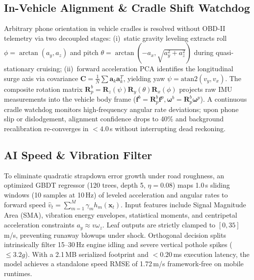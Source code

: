 \documentclass[conference]{IEEEtran}
\begin{document}
\subsection{In-Vehicle Alignment \& Cradle Shift Watchdog}
Arbitrary phone orientation in vehicle cradles is resolved without OBD-II telemetry via two decoupled stages: (i)~static gravity leveling extracts roll $\phi = \arctan(a_y, a_z)$ and pitch $\theta = \arctan(-a_x, \sqrt{a_y^2+a_z^2})$ during quasi-stationary cruising; (ii)~forward acceleration PCA identifies the longitudinal surge axis via covariance $\mathbf{C} = \frac{1}{N}\sum \mathbf{a}_k \mathbf{a}_k^T$, yielding yaw $\psi = \text{atan2}(v_y, v_x)$. The composite rotation matrix $\mathbf{R}_p^b = \mathbf{R}_z(\psi)\mathbf{R}_y(\theta)\mathbf{R}_x(\phi)$ projects raw IMU measurements into the vehicle body frame ($\mathbf{f}^b = \mathbf{R}_p^b \mathbf{f}^p, \boldsymbol{\omega}^b = \mathbf{R}_p^b \boldsymbol{\omega}^p$). A continuous cradle watchdog monitors high-frequency angular rate deviations; upon phone slip or dislodgement, alignment confidence drops to 40\% and background recalibration re-converges in $<4.0$\,s without interrupting dead reckoning.

\subsection{AI Speed \& Vibration Filter}
To eliminate quadratic strapdown error growth under road roughness, an optimized GBDT regressor (120 trees, depth 5, $\eta=0.08$) maps 1.0\,s sliding windows (10 samples at 10\,Hz) of leveled acceleration and angular rates to forward speed $\hat{v}_t = \sum_{m=1}^{M} \gamma_m h_m(\mathbf{x}_t)$. Input features include Signal Magnitude Area (SMA), vibration energy envelopes, statistical moments, and centripetal acceleration constraints $a_y \approx v\omega_z$. Leaf outputs are strictly clamped to $[0, 35]$\,m/s, preventing runaway blowups under shock. Orthogonal decision splits intrinsically filter 15--30\,Hz engine idling and severe vertical pothole spikes ($\leq 3.2g$). With a 2.1\,MB serialized footprint and $<0.20$\,ms execution latency, the model achieves a standalone speed RMSE of 1.72\,m/s framework-free on mobile runtimes.
\end{document}
